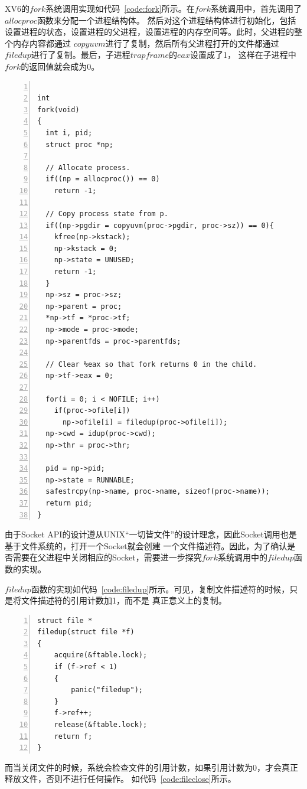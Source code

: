 \documentclass[a4paper,twoside]{article}
\begin{document}
\begin{spacing}{1.2}
XV6的$fork$系统调用实现如代码~\ref{code:fork}所示。在$fork$系统调用中，首先调用了$allocproc$函数来分配一个进程结构体。
然后对这个进程结构体进行初始化，包括设置进程的状态，设置进程的父进程，设置进程的内存空间等。此时，父进程的整个内存内容都通过
$copyuvm$进行了复制，然后所有父进程打开的文件都通过$filedup$进行了复制。最后，子进程$trapframe$的$eax$设置成了1，
这样在子进程中$fork$的返回值就会成为0。

\begin{lstlisting}[numbers=left,style=CppStyle,caption={XV6的$fork$系统调用实现},label={code:fork}]

int
fork(void)
{
  int i, pid;
  struct proc *np;

  // Allocate process.
  if((np = allocproc()) == 0)
    return -1;

  // Copy process state from p.
  if((np->pgdir = copyuvm(proc->pgdir, proc->sz)) == 0){
    kfree(np->kstack);
    np->kstack = 0;
    np->state = UNUSED;
    return -1;
  }
  np->sz = proc->sz;
  np->parent = proc;
  *np->tf = *proc->tf;
  np->mode = proc->mode;
  np->parentfds = proc->parentfds;

  // Clear %eax so that fork returns 0 in the child.
  np->tf->eax = 0;

  for(i = 0; i < NOFILE; i++)
    if(proc->ofile[i])
      np->ofile[i] = filedup(proc->ofile[i]);
  np->cwd = idup(proc->cwd);
  np->thr = proc->thr;

  pid = np->pid;
  np->state = RUNNABLE;
  safestrcpy(np->name, proc->name, sizeof(proc->name));
  return pid;
}
\end{lstlisting}

由于Socket API的设计遵从UNIX“一切皆文件”的设计理念，因此Socket调用也是基于文件系统的，打开一个Socket就会创建
一个文件描述符。因此，为了确认是否需要在父进程中关闭相应的Socket，需要进一步探究$fork$系统调用中的$filedup$函数的实现。

$filedup$函数的实现如代码~\ref{code:filedup}所示。可见，复制文件描述符的时候，只是将文件描述符的引用计数加1，而不是
真正意义上的复制。

\begin{lstlisting}[numbers=left,style=CppStyle,caption={$filedup$函数的实现},label={code:filedup}]
struct file *
filedup(struct file *f)
{
	acquire(&ftable.lock);
	if (f->ref < 1)
	{
		panic("filedup");
	}
	f->ref++;
	release(&ftable.lock);
	return f;
}
\end{lstlisting}

而当关闭文件的时候，系统会检查文件的引用计数，如果引用计数为0，才会真正释放文件，否则不进行任何操作。
如代码~\ref{code:fileclose}所示。


\end{spacing}
\end{document}
